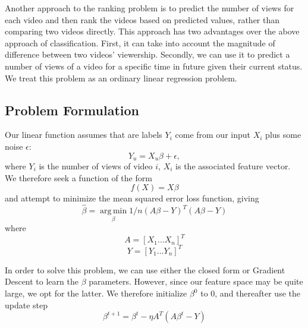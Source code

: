 Another approach to the ranking problem is to predict the number of views for each video and then rank the videos based on predicted values, rather than comparing two videos directly. This approach has two advantages over the above approach of classification. First, it can take into account the magnitude of difference between two videos' viewership. Secondly, we can use it to predict a number of views of a video for a specific time in future given their current status. We treat this problem as an ordinary linear regression problem. 

\subsection{Problem Formulation}
Our linear function assumes that are labels $Y_i$ come from our input $X_i$ plus some noise $\epsilon$:
\begin{equation}
Y_u = X_u \beta + \epsilon,
\end{equation}
where $Y_i$ is the number of views of video $i$, $X_i$ is the associated feature vector. We therefore seek a function of the form
\begin{equation}
f(X) = X \beta
\end{equation}
and attempt to minimize the mean squared error loss function, giving
\begin{equation}
	\hat{\beta} = \operatorname*{arg\,min}_{\textbf{$\beta$}} 1/n (A \beta - Y)^T(A \beta - Y)
\end{equation}
where
\begin{equation}
	A = [X_1 ... X_n]^T
\end{equation}
\begin{equation}
	Y = [Y_1 ... Y_n]^T
\end{equation}
  

In order to solve this problem, we can use either the closed form or Gradient Descent to learn the $\beta$ parameters.  However, since our feature space may be quite large, we opt for the latter.  We therefore initialize $\beta^0$ to 0, and thereafter use the update step
\begin{equation}
\beta^{t+1} = \beta^t - \eta A^T (A \beta^t - Y)
\end{equation}
 
